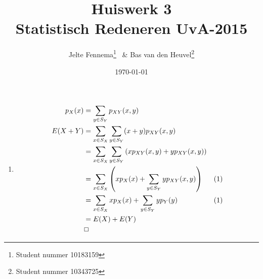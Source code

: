 \documentclass{article}
\title{Huiswerk 3\\ \large{Statistisch Redeneren UvA-2015}}
\author{Jelte Fennema\thanks{Student nummer 10183159} ~\& Bas van den
Heuvel\thanks{Student nummer 10343725}}
\date{\today}
\begin{document}
\maketitle

\begin{enumerate}
    \item
        \begin{align}
            p_X(x) &= \sum_{y \in S_Y} p_{XY}(x, y) \\
            E(X+Y) &= \sum_{x \in S_X} \sum_{y \in S_Y} (x+y)p_{XY}(x,y) \notag \\
                   &= \sum_{x \in S_X} \sum_{y \in S_Y} \left(xp_{XY}(x, y)
            +yp_{XY}(x, y) \right) \notag \\
                   &= \sum_{x \in S_X} \left(xp_X(x) + \sum_{y \in S_Y}
            yp_{XY}(x,y)\right)
            & (1) \notag \\
                   &= \sum_{x \in S_X} xp_X(x) + \sum_{y \in S_Y} yp_Y(y) & (1)
            \notag \\
                   &= E(X) + E(Y) \notag \\
                   & \Box \notag
        \end{align}
\end{enumerate}
\end{document}
